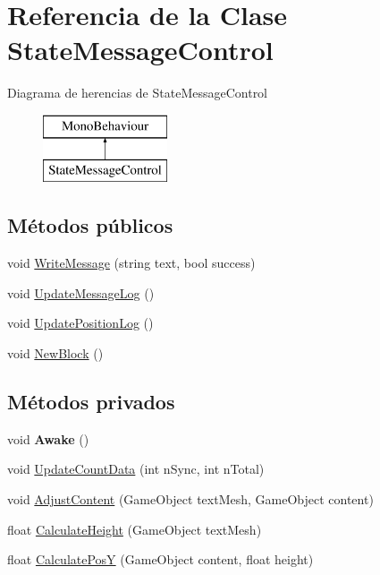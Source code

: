 \hypertarget{class_state_message_control}{}\section{Referencia de la Clase State\+Message\+Control}
\label{class_state_message_control}
Diagrama de herencias de State\+Message\+Control\begin{figure}[H]
\begin{center}
\leavevmode
\includegraphics[height=2.000000cm]{class_state_message_control}
\end{center}
\end{figure}
\subsection*{Métodos públicos}
\begin{DoxyCompactItemize}
\item 
void \mbox{\hyperlink{class_state_message_control_a0b0830fc3f8fe9d578fce4b3d944cde6}{Write\+Message}} (string text, bool success)
\item 
void \mbox{\hyperlink{class_state_message_control_af56933aa9a5a8d7d2c1e5fd515ec65e8}{Update\+Message\+Log}} ()
\item 
void \mbox{\hyperlink{class_state_message_control_aeace074591852cb0cc7125520bc49817}{Update\+Position\+Log}} ()
\item 
void \mbox{\hyperlink{class_state_message_control_a534610a9734b552696484aaeeb83c8b7}{New\+Block}} ()
\end{DoxyCompactItemize}
\subsection*{Métodos privados}
\begin{DoxyCompactItemize}
\item 
\mbox{\label{class_state_message_control_a353bea223ecc1cb5588264e024fd6893}} 
void {\bfseries Awake} ()
\item 
void \mbox{\hyperlink{class_state_message_control_a09f2f0b683668a6b87f01078626c1ee0}{Update\+Count\+Data}} (int n\+Sync, int n\+Total)
\item 
void \mbox{\hyperlink{class_state_message_control_a251349ec61d12eff0a0dbb4871991c94}{Adjust\+Content}} (Game\+Object text\+Mesh, Game\+Object content)
\item 
float \mbox{\hyperlink{class_state_message_control_a4ec35157d5b660616e1c8a7340d9f04d}{Calculate\+Height}} (Game\+Object text\+Mesh)
\item 
float \mbox{\hyperlink{class_state_message_control_a2f45459b571b7afcf4967d9bbca1f5b6}{Calculate\+PosY}} (Game\+Object content, float height)
\end{DoxyCompactItemize}
